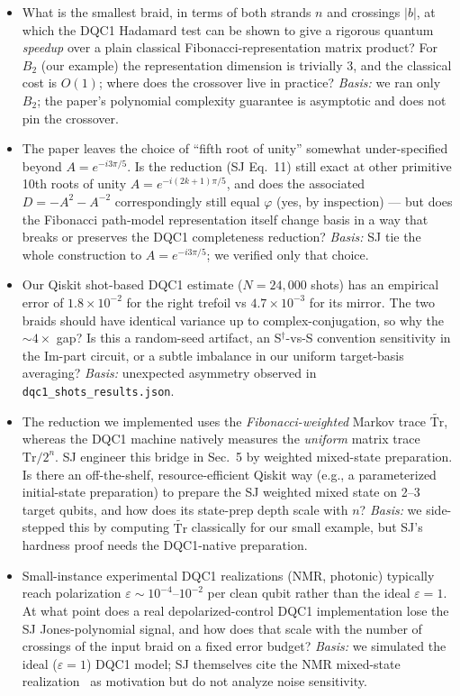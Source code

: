 \documentclass[11pt]{article}
\begin{document}
\begin{itemize}
\item[\textbf{Q1}] What is the smallest braid, in terms of both strands
$n$ and crossings $|b|$, at which the DQC1 Hadamard test can be shown to
give a rigorous quantum \emph{speedup} over a plain classical
Fibonacci-representation matrix product? For $B_2$ (our example) the
representation dimension is trivially 3, and the classical cost is
$O(1)$; where does the crossover live in practice?
\emph{Basis:} we ran only $B_2$; the paper's polynomial complexity
guarantee is asymptotic and does not pin the crossover.

\item[\textbf{Q2}] The paper leaves the choice of ``fifth root of unity''
somewhat under-specified beyond $A=e^{-i3\pi/5}$. Is the reduction (SJ
Eq.~11) still exact at other primitive 10th roots of unity
$A=e^{-i(2k+1)\pi/5}$, and does the associated $D=-A^2-A^{-2}$
correspondingly still equal $\varphi$ (yes, by inspection) --- but does the
Fibonacci path-model representation itself change basis in a way that
breaks or preserves the DQC1 completeness reduction?
\emph{Basis:} SJ tie the whole construction to $A=e^{-i3\pi/5}$; we
verified only that choice.

\item[\textbf{Q3}] Our Qiskit shot-based DQC1 estimate ($N=24{,}000$
shots) has an empirical error of $1.8\times10^{-2}$ for the right
trefoil vs $4.7\times10^{-3}$ for its mirror. The two braids should have
identical variance up to complex-conjugation, so why the $\sim 4\times$
gap? Is this a random-seed artifact, an
S$^\dagger$-vs-S convention sensitivity in the Im-part circuit, or a
subtle imbalance in our uniform target-basis averaging?
\emph{Basis:} unexpected asymmetry observed in
\texttt{dqc1\_shots\_results.json}.

\item[\textbf{Q4}] The reduction we implemented uses the
\emph{Fibonacci-weighted} Markov trace $\widetilde{\mathrm{Tr}}$, whereas
the DQC1 machine natively measures the \emph{uniform} matrix trace
$\mathrm{Tr}/2^n$. SJ engineer this bridge in Sec.~5 by weighted mixed-state
preparation. Is there an off-the-shelf, resource-efficient Qiskit way
(e.g., a parameterized initial-state preparation) to prepare the SJ
weighted mixed state on 2--3 target qubits, and how does its state-prep
depth scale with $n$?
\emph{Basis:} we side-stepped this by computing $\widetilde{\mathrm{Tr}}$
classically for our small example, but SJ's hardness proof needs the
DQC1-native preparation.

\item[\textbf{Q5}] Small-instance experimental DQC1 realizations (NMR,
photonic) typically reach polarization $\varepsilon \sim 10^{-4}$--$10^{-2}$
per clean qubit rather than the ideal $\varepsilon=1$. At what point does
a real depolarized-control DQC1 implementation lose the SJ Jones-polynomial
signal, and how does that scale with the number of crossings of the
input braid on a fixed error budget?
\emph{Basis:} we simulated the ideal ($\varepsilon=1$) DQC1 model; SJ
themselves cite the NMR mixed-state realization~\cite{KL98} as motivation
but do not analyze noise sensitivity.
\end{itemize}
\end{document}
